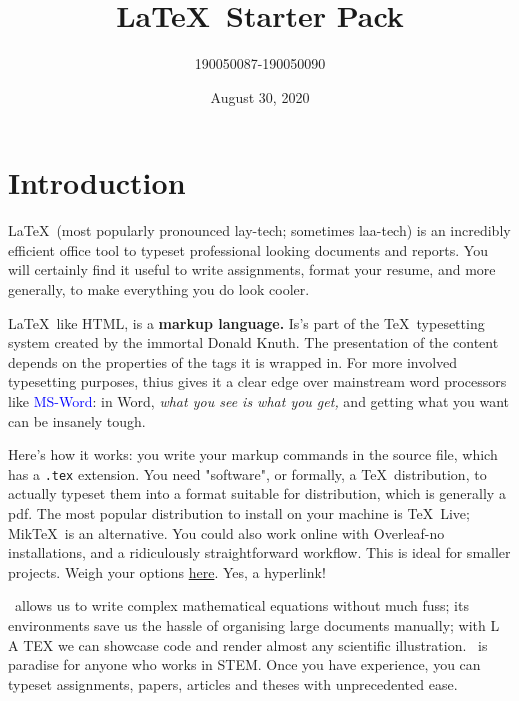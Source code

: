 \documentclass[10pt, Computer Modern]{article}
\begin{document}
\title{\LaTeX\ Starter Pack}
\author{190050087-190050090}
\date{August 30, 2020 }
\maketitle
\tableofcontents
\thispagestyle{empty}


\clearpage
\section{Introduction}
\label{intro}
\LaTeX\ (most popularly pronounced lay-tech; sometimes laa-tech) is an incredibly efficient office tool to typeset professional looking documents and reports. You will certainly find it useful to write assignments, format your resume, and more generally, to make everything you do look cooler.




\LaTeX\, like HTML, is a \textbf{markup language.} Is's part of the \TeX\ typesetting system created by the immortal Donald Knuth. The presentation of the content depends on the properties of the tags it is wrapped in. For more involved typesetting purposes, thius gives it a clear edge over mainstream word processors like \textcolor{blue}{MS-Word}: in Word, \textit{what you see is what you get,} and getting what you want can be insanely tough.




Here's how it works: you write your markup commands in the source file, which has a \verb!.tex! extension. You need "software", or formally, a \TeX\ distribution, to actually typeset them into a format suitable for distribution, which is generally a pdf. The most popular distribution to install on your machine is \TeX\ Live; Mik\TeX\ is an alternative. You could also work online with Overleaf-no installations, and a ridiculously straightforward workflow. This is ideal for smaller projects. Weigh your options \href{https://www.latex-project.org/get/}{here}. Yes, a hyperlink!



\LATEX\ allows us to write complex mathematical equations without much fuss; its environments
save us the hassle of organising large documents manually; with L A TEX we can showcase code and
render almost any scientific illustration. \LATEX\ is paradise for anyone who works in STEM. Once
you have experience, you can typeset assignments, papers, articles and theses with unprecedented
ease.
\end{document}
